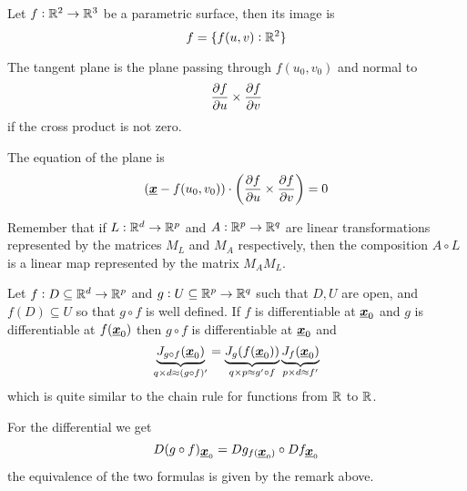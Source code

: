 \documentclass[12pt]{extarticle}
\renewcommand{\vec}[1]{\uvec{#1}}
\begin{document}
\begin{example}
    Let $f: \mathbb{R}^2 \to \mathbb{R}^3$ be a parametric surface, then its image is
    \begin{equation}
        f = \{ f(u, v) : \mathbb{R}^2 \}
    \end{equation}

    The tangent plane is the plane passing through $f(u_0, v_0)$ and normal to
    \begin{equation}
        \pdv{f}{u} \times \pdv{f}{v}
    \end{equation}
    if the cross product is not zero.

    The equation of the plane is
    \begin{equation}
        (\vec{x} - f(u_0, v_0)) \cdot \left( \pdv{f}{u}\/ \times \pdv{f}{v}\/ \right) = 0
    \end{equation}

\end{example}


\begin{remark}
    Remember that if $L: \mathbb{R}^d \to \mathbb{R}^p$ and $A: \mathbb{R}^p \to \mathbb{R}^q$ are linear transformations represented by the matrices $M_L$ and $M_A$ respectively, then the composition $A \circ L$ is a linear map represented by the matrix $M_A M_L$.
\end{remark}

\begin{theorem}
    Let $f: D \subseteq \mathbb{R}^d \to \mathbb{R}^p$ and $g: U \subseteq \mathbb{R}^p \to \mathbb{R}^q$ such that $D, U$ are open, and $f(D) \subseteq U$ so that $g \circ f$ is well defined.
    If $f$ is differentiable at $\vec{x}_0$ and $g$ is differentiable at $f(\vec{x}_0)$ then $g \circ f$ is differentiable at $\vec{x}_0$ and
    \begin{equation}
        \underbrace{J_{g \circ f}(\vec{x}_0)}_{q \times d \approx (g \circ f)'} =
        \underbrace{J_g(f(\vec{x}_0))}_{q \times p \approx g' \circ f}
        \underbrace{J_f(\vec{x}_0)}_{p \times d \approx f'}
    \end{equation}
    which is quite similar to the chain rule for functions from $\mathbb{R}$ to $\mathbb{R}$.

    For the differential we get
    \begin{equation}
        D(g \circ f)_{\vec{x}_0} = Dg_{f(\vec{x}_0)} \circ Df_{\vec{x}_0}
    \end{equation}
    the equivalence of the two formulas is given by the remark above.
\end{theorem}
\end{document}
